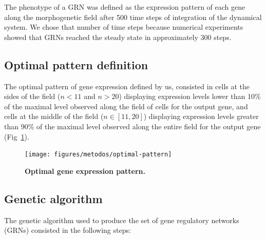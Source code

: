 \documentclass[10pt,letterpaper]{article}
\begin{document}
The phenotype of a GRN was defined as the expression pattern of each gene along 
the morphogenetic field after 500 time steps of integration of the dynamical 
system. We chose that number of time steps because numerical experiments showed 
that GRNs reached the steady state in approximately 300 steps.

\subsection*{Optimal pattern definition}

The optimal pattern of gene expression defined by us, consisted in cells at the 
sides of the field ($n<11$ and $n>20$) displaying expression levels lower than 
10\% of the maximal level observed along the field of cells for the output gene,
and cells at the middle of the field ($n ∈ [11,20]$) displaying expression 
levels greater than 90\% of the maximal level observed along the entire field 
for the output gene (Fig~\ref{fig:exp-pattern}).

\begin{figure}[!h]
 \texttt{[image: figures/metodos/optimal-pattern]}
 \caption{\bf Optimal gene expression pattern.}
 \label{fig:exp-pattern}
\end{figure}

\subsection*{Genetic algorithm}

The genetic algorithm used to produce the set of gene regulatory networks (GRNs)
consisted in the following steps:
\end{document}
